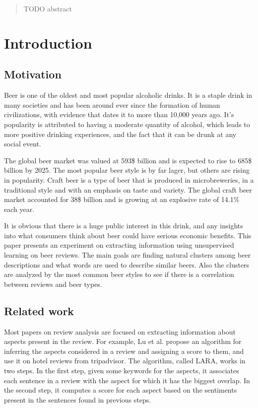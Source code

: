 \documentclass[12pt]{article}
\begin{document}
	\title{}
	\author{Stefan Sebastian, 242}
	\date{}
	\maketitle
	
	\begin{abstract}
	TODO abstract
	\end{abstract}

	\newpage
	\tableofcontents
	\newpage
	
	\section{Introduction}
	\subsection{Motivation}
	Beer is one of the oldest and most popular alcoholic drinks. It is a staple drink in many societies and has been around ever since the formation of human civilizations, with evidence that dates it to more than 10,000 years ago\cite{BeerArticleTime}. It's popularity is attributed to having a moderate quantity of alcohol, which leads to more positive drinking experiences, and the fact that it can be drunk at any social event\cite{BeerArticleTime}.
	
	The global beer market was valued at 593\$ billion and is expected to rise to 685\$ billion by 2025\cite{BeerStats}. The most popular beer style is by far lager, but others are rising in popularity. Craft beer is a type of beer that is produced in microbreweries, in a traditional style and with an emphasis on taste and variety. The global craft beer market accounted for 38\$ billion and is growing at an explosive rate of 14.1\% each year\cite{CraftBeerStats}.
	
	 It is obvious that there is a huge public interest in this drink, and any insights into what consumers think about beer could have serious economic benefits. This paper presents an experiment on extracting information using unsupervised learning on beer reviews. The main goals are finding natural clusters among beer descriptions and what words are used to describe similar beers. Also the clusters are analyzed by the most common beer styles to see if there is a correlation between reviews and beer types.
	
	\subsection{Related work}
	Most papers on review analysis are focused on extracting information about aspects present in the review. For example, Lu et al.\cite{LARA} propose an algorithm for inferring the aspects considered in a review and assigning a score to them, and use it on hotel reviews from tripadvisor. The algorithm, called LARA, works in two steps. In the first step, given some keywords for the aspects, it associates each sentence in a review with the aspect for which it has the biggest overlap. In the second step, it computes a score for each aspect based on the sentiments present in the sentences found in previous steps.
	
\end{document}
